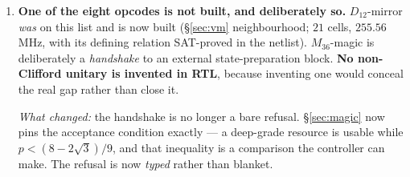 \documentclass[11pt,a4paper]{article}
\begin{document}
\begin{enumerate}[leftmargin=*,itemsep=4pt]
\item \textbf{One of the eight opcodes is not built, and deliberately so.}
      $D_{12}$-mirror \emph{was} on this list and is now built (\S\ref{sec:vm}
      neighbourhood; $21$ cells, $255.56$\,MHz, with its defining relation
      SAT-proved in the netlist).
      $M_{36}$-magic is deliberately a \emph{handshake} to an external state-preparation
      block. \textbf{No non-Clifford unitary is invented in RTL}, because inventing one
      would conceal the real gap rather than close it.

      \emph{What changed:} the handshake is no longer a bare refusal. \S\ref{sec:magic}
      now pins the acceptance condition exactly --- a deep-grade resource is usable while
      $p<(8-2\sqrt3)/9$, and that inequality is a comparison the controller can make. The
      refusal is now \emph{typed} rather than blanket.


\end{enumerate}
\end{document}
